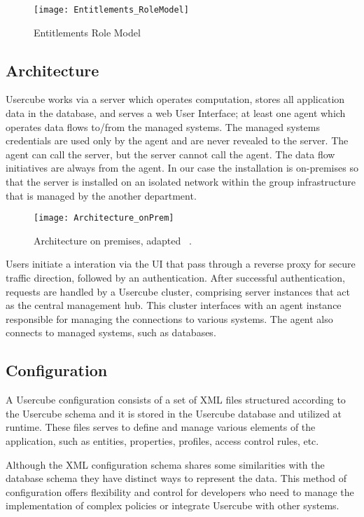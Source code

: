 \begin{figure}[htbp]
  \centering
  \texttt{[image: Entitlements\_RoleModel]}
  \caption{Entitlements Role Model}
  \label{fig:Entitlements_RoleModel}
\end{figure}

\subsection{Architecture}

Usercube works via a server which operates computation, stores all application data in the database, and serves a web User Interface; at least one agent which operates data flows to/from the managed systems. The managed systems credentials are used only by the agent and are never revealed to the server. The agent can call the server, but the server cannot call the agent. The data flow initiatives are always from the agent. In our case the installation is on-premises so that the server is installed on an isolated network within the group infrastructure that is managed by the another department.

\begin{figure}[htbp]
  \centering
  \texttt{[image: Architecture\_onPrem]}
  \caption{Architecture on premises, adapted ~\cite{UsercubeDocument}.}
  \label{fig:Architecture_onPrem}
\end{figure}

Users initiate a interation via the UI that pass through a reverse proxy for secure traffic direction, followed by an authentication. After successful authentication, requests are handled by a Usercube cluster, comprising server instances that act as the central management hub. This cluster interfaces with an agent instance responsible for managing the connections to various systems. The agent also connects to managed systems, such as databases.

\subsection{Configuration}

A Usercube configuration consists of a set of XML files structured according to the Usercube schema and it is stored in the Usercube database and utilized at runtime. These files serves to define and manage various elements of the application, such as entities, properties, profiles, access control rules, etc. 

Although the XML configuration schema shares some similarities with the database schema they have distinct ways to represent the data. This method of configuration offers flexibility and control for developers who need to manage the implementation of complex policies or integrate Usercube with other systems.

